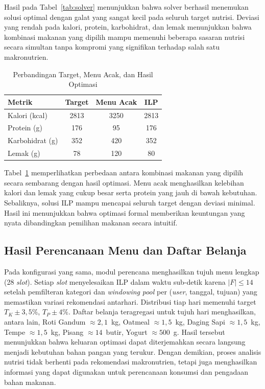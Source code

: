 \documentclass[conference]{IEEEtran}
\begin{document}
Hasil pada Tabel~\ref{tab:solver} menunjukkan bahwa solver
berhasil menemukan solusi optimal dengan galat yang sangat
kecil pada seluruh target nutrisi. Deviasi yang rendah pada
kalori, protein, karbohidrat, dan lemak menunjukkan bahwa
kombinasi makanan yang dipilih mampu memenuhi beberapa
sasaran nutrisi secara simultan tanpa kompromi yang
signifikan terhadap salah satu makronutrien.

\begin{table}[!ht]
\caption{Perbandingan Target, Menu Acak, dan Hasil Optimasi}
\centering
\begin{tabular}{lccc}
\toprule
Metrik & Target & Menu Acak & ILP \\
\midrule
Kalori (kcal) & 2813 & 3250 & 2813 \\
Protein (g) & 176 & 95 & 176 \\
Karbohidrat (g) & 352 & 420 & 352 \\
Lemak (g) & 78 & 120 & 80 \\
\bottomrule
\end{tabular}
\label{tab:comparison_opt}
\end{table}

Tabel~\ref{tab:comparison_opt} memperlihatkan perbedaan antara
kombinasi makanan yang dipilih secara sembarang dengan hasil optimasi.
Menu acak menghasilkan kelebihan kalori dan lemak yang cukup besar serta
protein yang jauh di bawah kebutuhan. Sebaliknya, solusi ILP mampu
mencapai seluruh target dengan deviasi minimal. Hasil ini menunjukkan
bahwa optimasi formal memberikan keuntungan yang nyata dibandingkan
pemilihan makanan secara intuitif.

\subsection{Hasil Perencanaan Menu dan Daftar Belanja}
Pada konfigurasi yang sama, modul perencana menghasilkan tujuh menu lengkap (28 \textit{slot}). Setiap \textit{slot} menyelesaikan ILP dalam waktu sub-detik karena $|F|\le 14$ setelah pemfilteran kategori dan \textit{windowing} \textit{pool} per (\textit{user}, tanggal, tujuan) yang memastikan variasi rekomendasi antarhari. Distribusi tiap hari memenuhi target $T_K\pm 3{,}5\%$, $T_P\pm 4\%$. Daftar belanja teragregasi untuk tujuh hari menghasilkan, antara lain, Roti Gandum $\approx2{,}1$~kg, Oatmeal $\approx1{,}5$~kg, Daging Sapi $\approx1{,}5$~kg, Tempe $\approx1{,}5$~kg, Pisang $\approx14$~butir, Yogurt $\approx500$~g. 
Hasil tersebut menunjukkan bahwa keluaran optimasi dapat diterjemahkan
secara langsung menjadi kebutuhan bahan pangan yang terukur. Dengan
demikian, proses analisis nutrisi tidak berhenti pada rekomendasi
makronutrien, tetapi juga menghasilkan informasi yang dapat digunakan
untuk perencanaan konsumsi dan pengadaan bahan makanan.
\end{document}
